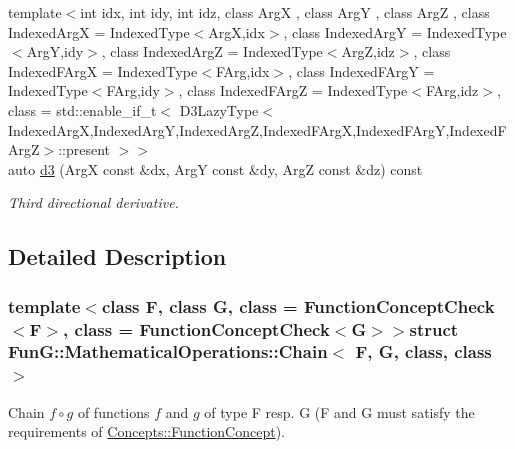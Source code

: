 \begin{DoxyCompactItemize}
{\footnotesize template$<$int idx, int idy, int idz, class Arg\-X , class Arg\-Y , class Arg\-Z , class Indexed\-Arg\-X  = Indexed\-Type$<$\-Arg\-X,idx$>$, class Indexed\-Arg\-Y  = Indexed\-Type$<$\-Arg\-Y,idy$>$, class Indexed\-Arg\-Z  = Indexed\-Type$<$\-Arg\-Z,idz$>$, class Indexed\-F\-Arg\-X  = Indexed\-Type$<$\-F\-Arg,idx$>$, class Indexed\-F\-Arg\-Y  = Indexed\-Type$<$\-F\-Arg,idy$>$, class Indexed\-F\-Arg\-Z  = Indexed\-Type$<$\-F\-Arg,idz$>$, class  = std\-::enable\-\_\-if\-\_\-t$<$ D3\-Lazy\-Type$<$\-Indexed\-Arg\-X,\-Indexed\-Arg\-Y,\-Indexed\-Arg\-Z,\-Indexed\-F\-Arg\-X,\-Indexed\-F\-Arg\-Y,\-Indexed\-F\-Arg\-Z$>$\-::present $>$$>$ }\\auto \hyperlink{structFunG_1_1MathematicalOperations_1_1Chain_a17ac1618545b9d9bd2efa873b36cfbc7}{d3} (Arg\-X const \&dx, Arg\-Y const \&dy, Arg\-Z const \&dz) const 
\begin{DoxyCompactList}\small\item\em Third directional derivative. \end{DoxyCompactList}\end{DoxyCompactItemize}


\subsection{Detailed Description}
\subsubsection*{template$<$class F, class G, class = Function\-Concept\-Check$<$\-F$>$, class = Function\-Concept\-Check$<$\-G$>$$>$struct Fun\-G\-::\-Mathematical\-Operations\-::\-Chain$<$ F, G, class, class $>$}

Chain $ f\circ g $ of functions $f$ and $g$ of type F resp. G (F and G must satisfy the requirements of \hyperlink{structFunG_1_1Concepts_1_1FunctionConcept}{Concepts\-::\-Function\-Concept}). 

